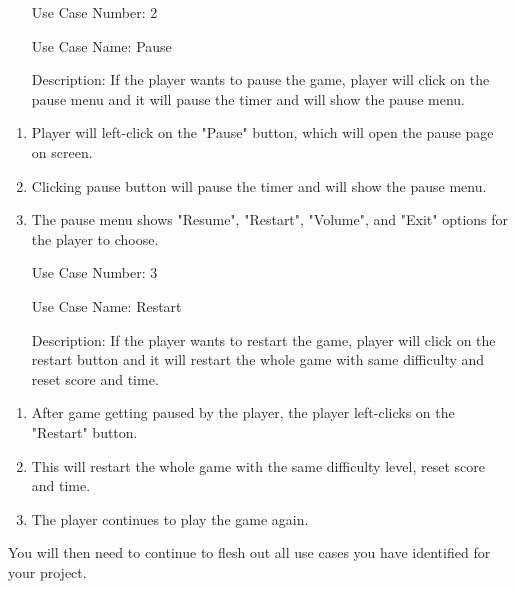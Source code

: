 \documentclass[10pt,conference,onecolumn,compsoc]{IEEEtran}
\begin{document}
\begin{itemize}
\item[Use Case Number:] 2
\item[Use Case Name:] Pause
\item[Description:] If the player wants to pause the game, player will click on the pause menu and it will pause the timer and will show the pause menu.
\end{itemize}


\begin{enumerate}
\item Player will left-click on the "Pause" button, which will open the pause page on screen.
\item Clicking pause button will pause the timer and will show the pause menu.
\item The pause menu shows "Resume", "Restart", "Volume", and "Exit" options for the player to choose.
\end{enumerate}


\begin{itemize}
\item[Use Case Number:] 3
\item[Use Case Name:] Restart
\item[Description:] If the player wants to restart the game, player will click on the restart button and it will restart the whole game with same difficulty and reset score and time.
\end{itemize}


\begin{enumerate}
\item After game getting paused by the player, the player left-clicks on the "Restart" button.
\item This will restart the whole game with the same difficulty level, reset score and time.
\item The player continues to play the game again.
\end{enumerate}

You will then need to continue to flesh out all use cases you have identified for your project.
\end{document}
